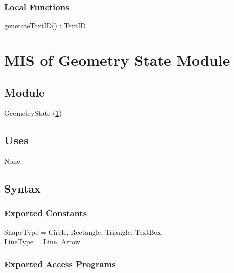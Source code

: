 \documentclass[12pt, titlepage]{article}
\begin{document}
%

\subsubsection{Local Functions}

generateTextID() : TextID

\newpage
\section{MIS of {Geometry State Module}} \label{Geometry State Module}
%
%

\subsection{Module}

GeometryState (\ref{Geometry State Module})

\subsection{Uses}
None

\subsection{Syntax}

\subsubsection{Exported Constants}
ShapeType = {Circle, Rectangle, Triangle, TextBox} \\
LineType = {Line, Arrow}

\subsubsection{Exported Access Programs}
\end{document}
